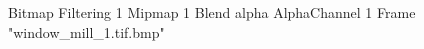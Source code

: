 {Bitmap
	{Filtering 1}
	{Mipmap 1}
	{Blend alpha}
	{AlphaChannel 1}
	{Frame "window_mill_1.tif.bmp"}
}
